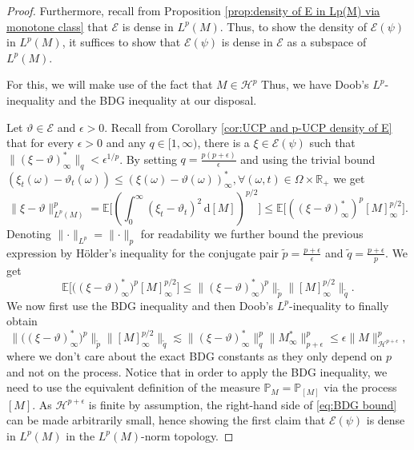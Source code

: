 \documentclass[11pt,a4paper,twoside,openany]{report}
\numberwithin{equation}{section}
\newcommand{\diff}{\mathrm{d}}
\theoremstyle{plain} %
\theoremstyle{definition} %
\theoremstyle{remark} %
\begin{document}
\begin{proof}
    Furthermore, recall from Proposition \ref{prop:density of E in Lp(M) via monotone class} that \(\mathcal{E}\) is dense in \(L^p(M)\). Thus, to show the density of \(\mathcal{E}(\psi)\) in \(L^p(M)\), it suffices to show that \(\mathcal{E}(\psi)\) is dense in \(\mathcal{E}\) as a subspace of \(L^p(M)\).

    
   For this, we will make use of the fact that \(M\in\mathcal{H}^p\) Thus, we have Doob's \(L^p\)-inequality and the BDG inequality at our disposal.
 
 
 Let \(\vartheta\in\mathcal{E}\) and  \(\epsilon>0\).
    Recall from Corollary \ref{cor:UCP and p-UCP density of E} that for every \(\epsilon>0\) and any \(q\in[1,\infty)\), there is a \(\xi\in\mathcal{E}(\psi)\) such that \(\lVert (\xi-\vartheta)^*_{\infty}\rVert_{q}<\epsilon^{1/p}\). By setting \(q=\frac{p(p+\epsilon)}{\epsilon}\) and using the trivial bound \((\xi_t(\omega)-\vartheta_t(\omega))\leq(\xi(\omega)-\vartheta(\omega))_{\infty}^*,\forall(\omega,t)\in\Omega\times\mathbb{R}_+\) we get
    \begin{equation*}
        \rVert \xi-\vartheta\lVert_{L^p(M)}^p=\mathbb{E}\bigg[(\int_{0}^{\infty}(\xi_t-\vartheta_t)^2\,\diff[M])^{p/2}\bigg]\leq\mathbb{E}\big[((\xi-\vartheta)_{\infty}^*)^p[M]_{\infty}^{p/2}\big].
    \end{equation*}
    Denoting \(\lVert\cdot\rVert_{L^p}=\lVert\cdot\rVert_{p}\) for readability we further bound the previous expression by Hölder's inequality for the conjugate pair \(\tilde{p}=\frac{p+\epsilon}{\epsilon}\) and \(\tilde{q}=\frac{p+\epsilon}{p}\). We get
    \begin{equation*}
        \mathbb{E}\big[\big((\xi-\vartheta)
        _{\infty}^*\big)^p[M]_{\infty}^{p/2}\big]\leq\lVert(\xi-\vartheta)_{\infty}^*)^p\rVert_{\tilde{p}}\lVert[M]_{\infty}^{p/2} \rVert_{\tilde{q}}.
    \end{equation*}
    We now first use the BDG inequality and then Doob's \(L^p\)-inequality to finally obtain
    \begin{equation}\label{eq:BDG bound}
        \lVert\big((\xi-\vartheta)_{\infty}^*\big)^p\rVert_{\tilde{p}}\lVert[M]_{\infty}^{p/2} \rVert_{\tilde{q}}\lesssim \lVert(\xi-\vartheta)_{\infty}^*\rVert_{q}^p\lVert M^*_{\infty}\rVert_{p+\epsilon}^p\leq\epsilon\lVert M\rVert_{\mathcal{H}^{p+\epsilon}}^p,
    \end{equation}
    where we don't care about the exact BDG constants as they only depend on \(p\) and not on the process. Notice that in order to apply the BDG inequality, we need to use the equivalent definition of the measure \(\mathbb{P}_M=\mathbb{P}_{[M]}\) via the process \([M]\).
    As \(\mathcal{H}^{p+\epsilon}\) is finite by assumption, the right-hand side of \eqref{eq:BDG bound} can be made arbitrarily small, hence showing the first claim that \(\mathcal{E}(\psi)\) is dense in \(L^p(M)\) in the \(L^p(M)\)-norm topology.


\end{proof}
\end{document}
